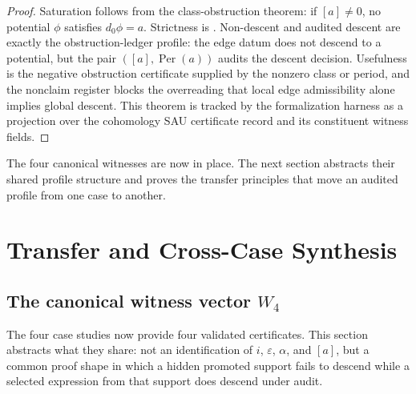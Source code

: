 \documentclass[11pt]{article}
\newcommand{\Per}{\operatorname{Per}}
\theoremstyle{definition}
\begin{document}
\begin{proof}
Saturation follows from the class-obstruction theorem: if \([a]\neq0\), no
potential \(\phi\) satisfies \(d_0\phi=a\).  Strictness is
.  Non-descent and audited descent are exactly the
obstruction-ledger profile: the edge datum does not descend to a potential, but
the pair \(([a],\Per(a))\) audits the descent decision.  Usefulness is the
negative obstruction certificate supplied by the nonzero class or period, and
the nonclaim register blocks the overreading that local edge admissibility alone
implies global descent.  This theorem is tracked by the formalization harness as
a projection over the cohomology SAU certificate record and its constituent
witness fields.
\end{proof}

The four canonical witnesses are now in place.  The next section abstracts their
shared profile structure and proves the transfer principles that move an
audited profile from one case to another.
 \section{Transfer and Cross-Case Synthesis}\label{sec:transfer}

\subsection{The canonical witness vector \texorpdfstring{\(W_4\)}{W4}}
\label{subsec:transfer-canonical-witness-vector}

The four case studies now provide four validated certificates.  This section
abstracts what they share: not an identification of \(i\), \(\varepsilon\),
\(\alpha\), and \([a]\), but a common proof shape in which a hidden promoted
support fails to descend while a selected expression from that support does
descend under audit.
\end{document}
